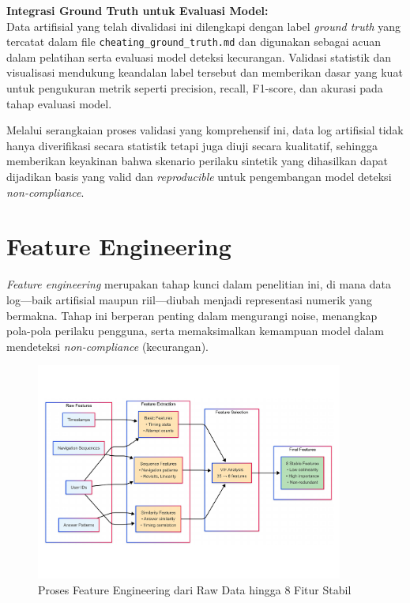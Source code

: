 \textbf{Integrasi Ground Truth untuk Evaluasi Model:} \\
Data artifisial yang telah divalidasi ini dilengkapi dengan label \textit{ground truth} yang tercatat dalam file \texttt{cheating\_ground\_truth.md} dan digunakan sebagai acuan dalam pelatihan serta evaluasi model deteksi kecurangan. Validasi statistik dan visualisasi mendukung keandalan label tersebut dan memberikan dasar yang kuat untuk pengukuran metrik seperti precision, recall, F1-score, dan akurasi pada tahap evaluasi model.

Melalui serangkaian proses validasi yang komprehensif ini, data log artifisial tidak hanya diverifikasi secara statistik tetapi juga diuji secara kualitatif, sehingga memberikan keyakinan bahwa skenario perilaku sintetik yang dihasilkan dapat dijadikan basis yang valid dan \textit{reproducible} untuk pengembangan model deteksi \textit{non-compliance}.

\section{Feature Engineering}
\label{sec:featureEngineering}
\textit{Feature engineering} merupakan tahap kunci dalam penelitian ini, di mana data log—baik artifisial maupun riil—diubah menjadi representasi numerik yang bermakna. Tahap ini berperan penting dalam mengurangi noise, menangkap pola-pola perilaku pengguna, serta memaksimalkan kemampuan model dalam mendeteksi \textit{non-compliance} (kecurangan). 

\begin{figure}[htbp]
    \centering
    \includegraphics[width=0.9\textwidth]{figures/feature_engineering_process.pdf}
    \caption{Proses Feature Engineering dari Raw Data hingga 8 Fitur Stabil}
    \label{fig:feature_engineering_process}
\end{figure}

